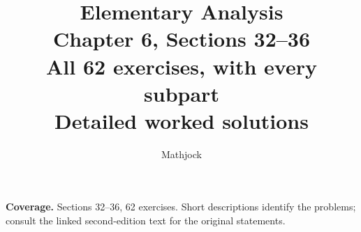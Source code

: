 
\title{\textbf{Elementary Analysis}\\[0.3em]
Chapter 6, Sections 32--36\\[0.4em]
\large All 62 exercises, with every subpart\\
Detailed worked solutions}
\author{Mathjock}
\date{}

\maketitle
\bookinfo
\par\textbf{Coverage.} Sections 32--36, 62 exercises. Short descriptions identify the problems; consult the linked second-edition text for the original statements.
\tableofcontents
\clearpage
\setcounter{section}{31}

\clearpage

\clearpage

\clearpage

\clearpage


